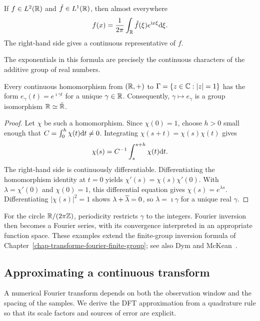 \begin{prop}
If $f\in L^2(\mathbb{R})$ and $\hat{f}\in L^1(\mathbb{R})$, then almost everywhere
\begin{equation}
\label{eq-formula-inversion-R}
 f(x)=\frac1{2\pi}\int_{\mathbb{R}}\hat{f}(\xi)e^{\mathrm{i} x\xi}\mathrm{d}\xi.
\end{equation}
The right-hand side gives a continuous representative of $f$.
\end{prop}
The exponentials in this formula are precisely the continuous characters of
the additive group of real numbers.
\begin{prop}
\label{prop-characters-r}\label{notation-52}
Every continuous homomorphism from $(\mathbb{R},+)$ to
$\Gamma=\{z\in\mathbb{C}:|z|=1\}$ has the form
$e_\gamma(t)=e^{\imath\gamma t}$ for a unique $\gamma\in\mathbb{R}$.
Consequently, $\gamma\mapsto e_\gamma$ is a group isomorphism
$\mathbb{R}\simeq\hat{\mathbb{R}}$.
\end{prop}
\begin{proof}
Let $\chi$ be such a homomorphism. Since $\chi(0)=1$, choose $h>0$ small
enough that $C=\int_0^h\chi(t)\mathrm{d} t\ne0$. Integrating
$\chi(s+t)=\chi(s)\chi(t)$ gives
\[
 \chi(s)=C^{-1}\int_s^{s+h}\chi(t)\mathrm{d} t.
\]
The right-hand side is continuously differentiable. Differentiating the
homomorphism identity at $t=0$ yields
$\chi'(s)=\chi(s)\chi'(0)$. With $\lambda=\chi'(0)$ and $\chi(0)=1$,
this differential equation gives $\chi(s)=e^{\lambda s}$.
Differentiating $|\chi(s)|^2=1$ shows $\lambda+\overline{\lambda}=0$,
so $\lambda=\imath\gamma$ for a unique real $\gamma$.
\end{proof}
For the circle $\mathbb{R}/(2\pi\mathbb{Z})$, periodicity restricts $\gamma$ to the
integers. Fourier inversion then becomes a Fourier series, with its
convergence interpreted in an appropriate function space. These examples
extend the finite-group inversion formula of Chapter~\ref{chap-transforme-fourier-finite-group};
see also Dym and McKean~\cite[Chapter~4]{dym}.

\subsection{Approximating a continuous transform}
\label{sect2-calculus-trans-fourier-approach}

A numerical Fourier transform depends on both the observation window and the
spacing of the samples. We derive the DFT approximation from a quadrature
rule so that its scale factors and sources of error are explicit.

